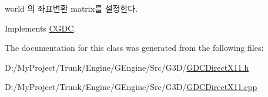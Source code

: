 \begin{DoxyItemize}
\item world 의 좌표변환 matrix를 설정한다. 
\end{DoxyItemize}

Implements \hyperlink{class_c_g_d_c_a97d98350fc40e17a2be3bf48318dd993}{C\+G\+D\+C}.



The documentation for this class was generated from the following files\+:\begin{DoxyCompactItemize}
\item 
D\+:/\+My\+Project/\+Trunk/\+Engine/\+G\+Engine/\+Src/\+G3\+D/\hyperlink{_g_d_c_direct_x11_8h}{G\+D\+C\+Direct\+X11.\+h}\item 
D\+:/\+My\+Project/\+Trunk/\+Engine/\+G\+Engine/\+Src/\+G3\+D/\hyperlink{_g_d_c_direct_x11_8cpp}{G\+D\+C\+Direct\+X11.\+cpp}\end{DoxyCompactItemize}
